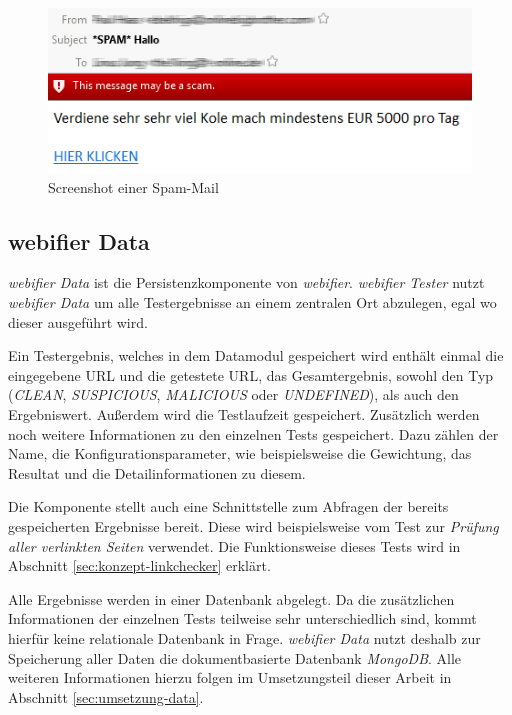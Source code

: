 \begin{figure}[H]
	\centering
	\includegraphics[width=12cm]{images/spam-mail.png}
	\caption{Screenshot einer Spam-Mail}
	\label{fig:spam-mail}
\end{figure}

\subsection{webifier Data}
\label{sec:konzept-data}

\textit{webifier Data} ist die Persistenzkomponente von \textit{webifier}. \textit{webifier Tester}
nutzt \textit{webifier Data} um alle Testergebnisse an einem zentralen Ort abzulegen, egal wo dieser
ausgeführt wird.

Ein Testergebnis, welches in dem Datamodul gespeichert wird enthält einmal die eingegebene \acs{URL}
und die getestete \acs{URL}, das Gesamtergebnis, sowohl den Typ (\textit{CLEAN},
\textit{SUSPICIOUS}, \textit{MALICIOUS} oder \textit{UNDEFINED}), als auch den Ergebniswert. Außerdem wird die Testlaufzeit gespeichert. Zusätzlich werden noch weitere Informationen zu den einzelnen Tests gespeichert. Dazu zählen der Name, die Konfigurationsparameter, wie beispielsweise die Gewichtung, das Resultat und die Detailinformationen zu diesem.

Die Komponente stellt auch eine Schnittstelle zum Abfragen der bereits gespeicherten Ergebnisse
bereit. Diese wird beispielsweise vom Test zur \textit{Prüfung aller verlinkten Seiten} verwendet.
Die Funktionsweise dieses Tests wird in Abschnitt \ref{sec:konzept-linkchecker} erklärt.

Alle Ergebnisse werden in einer Datenbank abgelegt. Da die zusätzlichen Informationen der einzelnen
Tests teilweise sehr unterschiedlich sind, kommt hierfür keine relationale Datenbank in Frage.
\textit{webifier Data} nutzt deshalb zur Speicherung aller Daten die dokumentbasierte Datenbank
\textit{MongoDB}. Alle weiteren Informationen hierzu folgen im Umsetzungsteil dieser Arbeit in
Abschnitt \ref{sec:umsetzung-data}.


